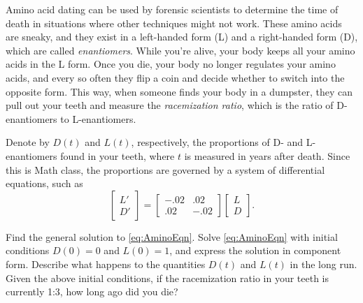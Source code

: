 \documentclass{ximera}
\begin{document}
\begin{exercise}
    Amino acid dating can be used by forensic scientists to determine the time of death in situations where other techniques might not work. These amino acids are sneaky, and they exist in a left-handed form (L) and a right-handed form (D), which are called {\it enantiomers}. While you’re alive, your body keeps all your amino acids in the L form. Once you die, your body no longer regulates your amino acids, and every so often they flip a coin and decide whether to switch into the opposite form. This way, when someone finds your body in a dumpster, they can pull out your teeth and measure the {\it racemization ratio}, which is the ratio of D-enantiomers to L-enantiomers. %

    Denote by $D(t)$ and $L(t)$, respectively, the proportions of D- and L-enantiomers found in your teeth, where $t$ is measured in years after death. Since this is Math class, the proportions are governed by a system of differential equations, such as
    \begin{equation}
        \begin{bmatrix} 
            L' \\ 
            D' 
        \end{bmatrix} 
        = 
        \begin{bmatrix} 
            -.02& .02\\ 
            .02 & -.02 
        \end{bmatrix}
        \begin{bmatrix} 
            L\\ 
            D 
        \end{bmatrix}.\label{eq:AminoEqn}
    \end{equation}
    \begin{tasks}
        \task Find the general solution to \eqref{eq:AminoEqn}.
        \task Solve \eqref{eq:AminoEqn} with initial conditions $D(0) = 0$ and $L(0) = 1$, and express the solution in component form. Describe what happens to the quantities $D(t)$ and $L(t)$ in the long run.
        \task Given the above initial conditions, if the racemization ratio in your teeth is currently 1:3, how long ago did you die?
    \end{tasks}
\end{exercise}
\end{document}
